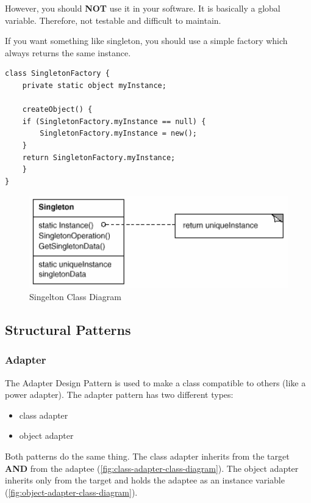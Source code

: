 \documentclass[11pt]{article}
\begin{document}
However, you should \textbf{NOT} use it in your software.
It is basically a global variable.
Therefore, not testable and difficult to maintain.

If you want something like singleton, you should use a simple factory which always returns the same instance.


\begin{lstlisting}
class SingletonFactory {
    private static object myInstance;

    createObject() {
	if (SingletonFactory.myInstance == null) {
	    SingletonFactory.myInstance = new();
	}
	return SingletonFactory.myInstance;
    }
}
\end{lstlisting}

\begin{figure}[htbp]
\centering
\includegraphics[width=.9\linewidth]{img/singleton.png}
\caption{\label{fig:singelton-class-diagram}Singelton Class Diagram}
\end{figure}

\subsection{Structural Patterns}
\label{sec:org74dbdbc}
\subsubsection{Adapter}
\label{sec:orgcad73a5}
The Adapter Design Pattern is used to make a class compatible to others (like a power adapter).
The adapter pattern has two different types:
\begin{itemize}
\item class adapter
\item object adapter
\end{itemize}


Both patterns do the same thing.
The class adapter inherits from the target \textbf{AND} from the adaptee (\ref{fig:class-adapter-class-diagram}).
The object adapter inherits only from the target and holds the adaptee as an instance variable (\ref{fig:object-adapter-class-diagram}).
\end{document}
